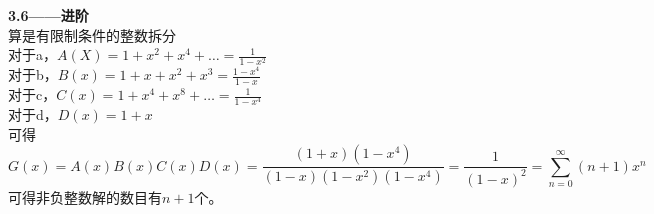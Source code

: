 \documentclass[a4paper,12pt]{article}
\begin{document}
	\noindent
	\textbf{3.6——进阶}\\
	算是有限制条件的整数拆分\\
	对于a，$A(X)=1+x^2+x^4+\dots=\frac{1}{1-x^2}$\\
	对于b，$B(x)=1+x+x^2+x^3=\frac{1-x^4}{1-x}$\\
	对于c，$C(x)=1+x^4+x^8+\dots=\frac{1}{1-x^4}$\\
	对于d，$D(x)=1+x$\\
	可得\[
		G(x)=A(x)B(x)C(x)D(x)=\frac{(1+x)(1-x^4)}{(1-x)(1-x^2)(1-x^4)}=\frac{1}{(1-x)^2}=\sum_{n=0}^{\infty}(n+1)x^n
	\]
	可得非负整数解的数目有$n+1$个。
	
	
	
	
\end{document}
